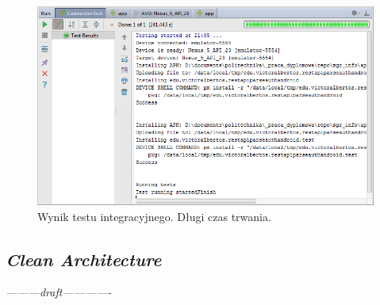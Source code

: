 \begin{itemize}
\begin{figure}[!htb]
    \centering
    \includegraphics[width=15cm]{imgs/ch6_app_st_test2.png}
    \caption
{Wynik testu integracyjnego. Długi czas trwania.}
    \label{fig:app_std_test2}
\end{figure} 

\end{itemize}

\newpage
\subsection{\textit{Clean Architecture}}
\textit{---------draft-------------}

